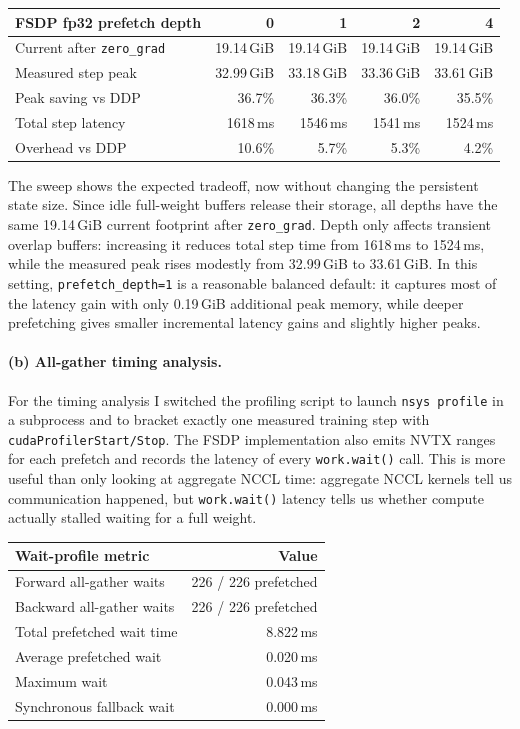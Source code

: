 \documentclass[11pt]{article}
\begin{document}
\begin{center}
\begin{tabular}{lrrrr}
\toprule
FSDP fp32 prefetch depth & 0 & 1 & 2 & 4 \\
\midrule
Current after \texttt{zero\_grad} & 19.14\,GiB & 19.14\,GiB & 19.14\,GiB & 19.14\,GiB \\
Measured step peak       & 32.99\,GiB & 33.18\,GiB & 33.36\,GiB & 33.61\,GiB \\
Peak saving vs DDP       & 36.7\% & 36.3\% & 36.0\% & 35.5\% \\
Total step latency       & 1618\,ms & 1546\,ms & 1541\,ms & 1524\,ms \\
Overhead vs DDP          & 10.6\% & 5.7\% & 5.3\% & 4.2\% \\
\bottomrule
\end{tabular}
\end{center}

The sweep shows the expected tradeoff, now without changing the persistent
state size.  Since idle full-weight buffers release their storage, all depths
have the same 19.14\,GiB current footprint after \texttt{zero\_grad}.  Depth
only affects transient overlap buffers: increasing it reduces total step time
from 1618\,ms to 1524\,ms, while the measured peak rises modestly from
32.99\,GiB to 33.61\,GiB.  In this setting, \texttt{prefetch\_depth=1} is a
reasonable balanced default: it captures most of the latency gain with only
0.19\,GiB additional peak memory, while deeper prefetching gives smaller
incremental latency gains and slightly higher peaks.

\paragraph{(b) All-gather timing analysis.}

For the timing analysis I switched the profiling script to launch
\texttt{nsys profile} in a subprocess and to bracket exactly one measured
training step with \texttt{cudaProfilerStart/Stop}.  The FSDP implementation
also emits NVTX ranges for each prefetch and records the latency of every
\texttt{work.wait()} call.  This is more useful than only looking at aggregate
NCCL time: aggregate NCCL kernels tell us communication happened, but
\texttt{work.wait()} latency tells us whether compute actually stalled waiting
for a full weight.

\begin{center}
\begin{tabular}{lr}
\toprule
\textbf{Wait-profile metric} & \textbf{Value} \\
\midrule
Forward all-gather waits & 226 / 226 prefetched \\
Backward all-gather waits & 226 / 226 prefetched \\
Total prefetched wait time & 8.822\,ms \\
Average prefetched wait & 0.020\,ms \\
Maximum wait & 0.043\,ms \\
Synchronous fallback wait & 0.000\,ms \\
\bottomrule
\end{tabular}
\end{center}
\end{document}

